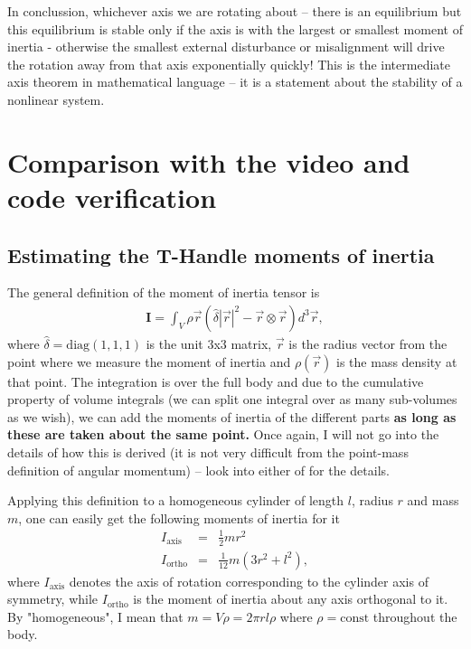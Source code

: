 \documentclass[a4paper]{article}
\begin{document}
	In conclussion, whichever axis we are rotating about -- there is an equilibrium but this equilibrium is stable only if the axis is with the largest or smallest moment of inertia - otherwise the smallest external disturbance or misalignment will drive the rotation away from that axis exponentially quickly!
	This is the intermediate axis theorem in mathematical language -- it is a statement about the stability of a nonlinear system. 
	
	\section{Comparison with the video and code verification}

	\subsection{Estimating the T-Handle moments of inertia}

	The general definition of the moment of inertia tensor is 
	\begin{eqnarray}\label{moi_definition}
		\mathbf{I} = \int_{V} \rho{\vec{r}}( \hat{ \delta } |\vec{r}|^2 - \vec{r} \otimes \vec{r} ) d^3 \vec{r}, 
	\end{eqnarray}
	where $\hat{\delta} = \mathrm{diag( 1 , 1 , 1 )}$ is the unit 3x3 matrix, $\vec{r}$ is the radius vector from the point where we measure the moment of inertia and $\rho(\vec{r})$ is the mass density at that point.
	The integration is over the full body and due to the cumulative property of volume integrals (we can split one integral over as many sub-volumes as we wish), we can add the moments of inertia of the different parts \textbf{as long as these are taken about the same point.}
	Once again, I will not go into the details of how this is derived (it is not very difficult from the point-mass definition of angular momentum) -- look into either of \cite{David_Tong,Goldstein,ADCS_bible} for the details.

	Applying this definition to a homogeneous cylinder of length $l$, radius $r$ and mass $m$, one can easily get the following moments of inertia for it 
	\begin{eqnarray}
		I_{\mathrm{axis}} &=& \frac{1}{2} m r^2 \\
		I_{\mathrm{ortho}} &=& \frac{1}{12}m( 3r^2 + l^2 ),
	\end{eqnarray}
	where $I_{\mathrm{axis}}$ denotes the axis of rotation corresponding to the cylinder axis of symmetry, while $I_{\mathrm{ortho}}$ is the moment of inertia about any axis orthogonal to it.
	By "homogeneous", I mean that $m = V\rho = 2\pi r l \rho$ where $\rho = \mathrm{const}$ throughout the body.
\end{document}
